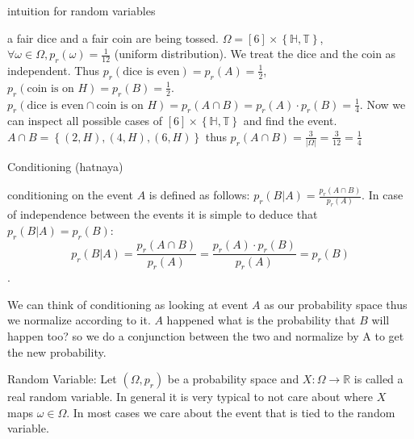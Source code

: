 \begin{example}
intuition for random variables

a fair dice and a fair coin are being tossed. $\Omega=\left[6\right]\times\left\{ \mathbb{H},\mathbb{T}\right\} $,
$\forall\omega\in\Omega,p_{r}\left(\omega\right)=\frac{1}{12}$ (uniform
distribution). We treat the dice and the coin as independent. Thus
$p_{r}\left(\text{dice is even}\right)=p_{r}\left(A\right)=\frac{1}{2}$,
$p_{r}\left(\text{coin is on }H\right)=p_{r}\left(B\right)=\frac{1}{2}$.
$p_{r}\left(\text{dice is even}\cap\text{coin is on }H\right)=p_{r}\left(A\cap B\right)=p_{r}\left(A\right)\cdot p_{r}\left(B\right)=\frac{1}{4}$.
Now we can inspect all possible cases of $\left[6\right]\times\left\{ \mathbb{H},\mathbb{T}\right\} $
and find the event. $A\cap B=\left\{ \left(2,H\right),\left(4,H\right),\left(6,H\right)\right\} $
thus $p_{r}\left(A\cap B\right)=\frac{3}{\left|\Omega\right|}=\frac{3}{12}=\frac{1}{4}$
\end{example}

\begin{definition}
Conditioning (hatnaya)
\begin{definition}
conditioning on the event $A$ is defined as follows: $p_{r}\left(B|A\right)=\frac{p_{r}\left(A\cap B\right)}{p_{r}\left(A\right)}$.
In case of independence between the events it is simple to deduce
that $p_{r}\left(B|A\right)=p_{r}\left(B\right)$: 
\[
p_{r}\left(B|A\right)=\frac{p_{r}\left(A\cap B\right)}{p_{r}\left(A\right)}=\frac{p_{r}\left(A\right)\cdot p_{r}\left(B\right)}{p_{r}\left(A\right)}=p_{r}\left(B\right)
\]
.
\end{definition}

\end{definition}

\begin{remark}
We can think of conditioning as looking at event $A$ as our probability
space thus we normalize according to it. $A$ happened what is the
probability that $B$ will happen too? so we do a conjunction between
the two and normalize by A to get the new probability.
\end{remark}

\begin{definition}
Random Variable: Let $\left(\Omega,p_{r}\right)$ be a probability
space and $X:\Omega\to\mathbb{R}$ is called a real random variable.
In general it is very typical to not care about where $X$ maps $\omega\in\Omega$.
In most cases we care about the event that is tied to the random variable. 
\end{definition}

